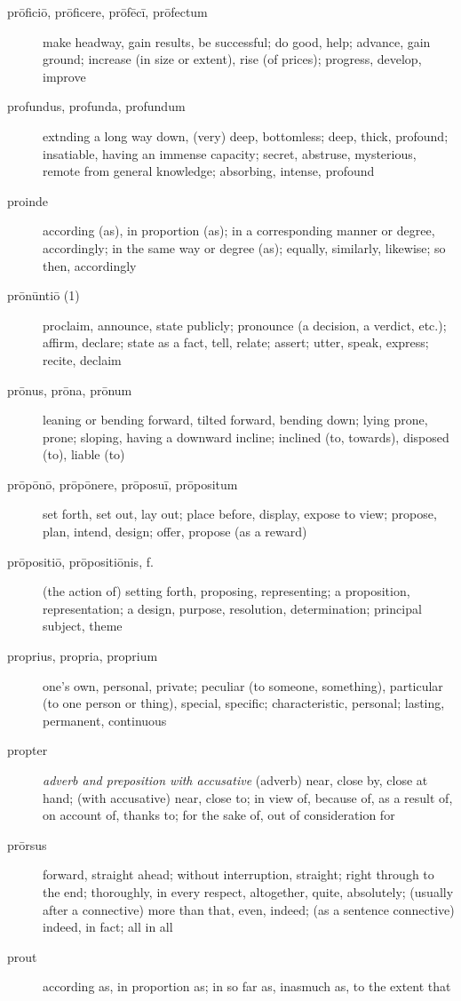 \begin{description}
    \item[prōficiō, prōficere, prōfēcī, prōfectum] make headway, gain results, be successful; do good, help; advance, gain ground; increase (in size or extent), rise (of prices); progress, develop, improve
    \item[profundus, profunda, profundum] extnding a long way down, (very) deep, bottomless; deep, thick, profound; insatiable, having an immense capacity; secret, abstruse, mysterious, remote from general knowledge; absorbing, intense, profound
    \item[proinde] according (as), in proportion (as); in a corresponding manner or degree, accordingly; in the same way or degree (as); equally, similarly, likewise; so then, accordingly
    \item[prōnūntiō (1)] proclaim, announce, state publicly; pronounce (a decision, a verdict, etc.); affirm, declare; state as a fact, tell, relate; assert; utter, speak, express; recite, declaim
    \item[prōnus, prōna, prōnum] leaning or bending forward, tilted forward, bending down; lying prone, prone; sloping, having a downward incline; inclined (to, towards), disposed (to), liable (to)
    \item[prōpōnō, prōpōnere, prōposuī, prōpositum] set forth, set out, lay out; place before, display, expose to view; propose, plan, intend, design; offer, propose (as a reward)
    \item[prōpositiō, prōpositiōnis, f.] (the action of) setting forth, proposing, representing; a proposition, representation; a design, purpose, resolution, determination; principal subject, theme
    \item[proprius, propria, proprium] \marginnote{*}one's own, personal, private; peculiar (to someone, something), particular (to one person or thing), special, specific; characteristic, personal; lasting, permanent, continuous
    \item[propter] \marginnote{*}\textit{adverb and preposition with accusative} (adverb) near, close by, close at hand; (with accusative) near, close to; in view of, because of, as a result of, on account of, thanks to; for the sake of, out of consideration for
    \item[prōrsus] forward, straight ahead; without interruption, straight; right through to the end; thoroughly, in every respect, altogether, quite, absolutely; (usually after a connective) more than that, even, indeed; (as a sentence connective) indeed, in fact; all in all
    \item[prout] according as, in proportion as; in so far as, inasmuch as, to the extent that

\end{description}

